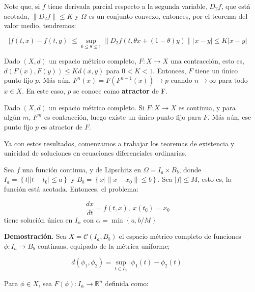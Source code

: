 Note que, si $f$ tiene derivada parcial respecto a la segunda variable, $D_2 f$, que está acotada, $\lVert D_2 f \rVert \leq K$ y $\Omega$ es un conjunto convexo, entonces, por el teorema del valor medio, tendremos:

\[
	\lvert f(t,x) - f(t, y) \rvert \leq \sup_{0 \leq \theta \leq 1} \lVert D_2 f(t, \theta x + (1 - \theta)y) \rVert \lvert x - y \rvert \leq K \lvert x - y \rvert
\] 

\begin{lema}
	Dado $(X, d)$ un espacio métrico completo, $F: X \rightarrow X$ una contracción, esto es, $d(F(x), F(y)) \leq K d(x, y)$ para $0 <  K < 1$. Entonces, $F$ tiene un único punto fijo $p$. Más aún, $F^n (x) = F(F^{n-1}(x)) \rightarrow p$ cuando $n \rightarrow \infty$ para todo $x \in X$. En este caso, $p$ se conoce como \textbf{atractor} de F.
\end{lema}

\begin{coro}
	Dado $(X, d)$ un espacio métrico completo. Si $F: X \rightarrow X$ es continua, y para algún $m$, $F^m$ es contracción, luego existe un único punto fijo para $F$. Más aún, ese punto fijo $p$ es atractor de $F$.
\end{coro}

Ya con estos resultados, comenzamos a trabajar los teoremas de existencia y unicidad de soluciones en ecuaciones diferenciales ordinarias.

\begin{theorem}
	Sea $f$ una función continua, y de Lipschitz en $\Omega = I_a \times B_b$, donde $I_a = \left\{ t \vert \lvert t - t_0 \rvert \leq a \right\}$ y $B_b = \left\{ x \vert \lVert x - x_0 \rVert \leq b \right\}$. Sea $\lvert f \rvert \leq M$, esto es, la función está acotada. Entonces, el problema:

	\[
		\frac{dx}{dt} = f(t,x),\ x(t_0) = x_0
	\]
	tiene solución única en $I_{\alpha}$ con $\alpha = \min \left\{ a, b/M \right\}$
\end{theorem}

\textbf{Demostración.} Sea $X = \mathcal{C}(I_a, B_b)$ el espacio métrico completo de funciones $\phi: I_a \rightarrow B_b$ continuas, equipado de la métrica uniforme;

\[
	d(\phi_1, \phi_2) = \sup_{t \in I_{\alpha}} \lvert \phi_1 (t) - \phi_2 (t) \rvert
\]

Para $\phi \in X$, sea $F(\phi): I_{\alpha} \rightarrow \mathbb{R}^n$ definida como:

